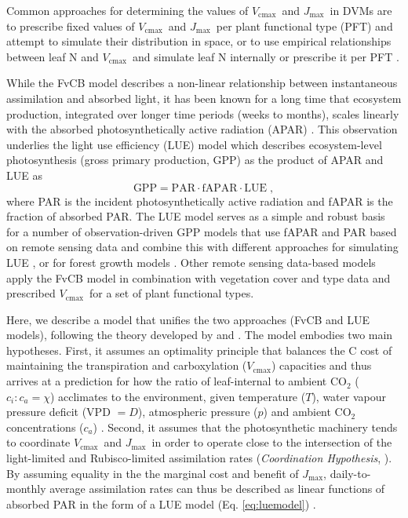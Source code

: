 \documentclass{myreport}
\newcommand{\vcmax}{$V_{\text{cmax}}$}
\newcommand{\jmax}{$J_{\text{max}}$}
\begin{document}
Common approaches for determining the values of \vcmax\ and \jmax\ in DVMs are to prescribe fixed values of \vcmax\ and \jmax\ per plant functional type (PFT) and attempt to simulate their distribution in space, or to use empirical relationships between leaf N and \vcmax\ and simulate leaf N internally or prescribe it per PFT \citep{smithdukes13gcb, rogers14}. 

While the FvCB model describes a non-linear relationship between instantaneous assimilation and absorbed light, it has been known for a long time that ecosystem production, integrated over longer time periods (weeks to months), scales linearly with the absorbed photosynthetically active radiation (APAR) \citep{monteith72, medlyn98}. This observation underlies the light use efficiency (LUE) model which describes ecosystem-level photosynthesis (gross primary production, GPP) as the product of APAR and LUE as
\begin{equation}
\label{eq:luemodel}
\text{GPP} = \text{PAR} \cdot \text{fAPAR} \cdot \text{LUE} \;,
\end{equation}
where PAR is the incident photosynthetically active radiation and fAPAR is the fraction of absorbed PAR. The LUE model serves as a simple and robust basis for a number of observation-driven GPP models that use fAPAR and PAR based on remote sensing data and combine this with different approaches for simulating LUE \citep{running04, Zhang2017-yr, field95rse}, or for forest growth models \citep{landsberg97fem}. Other remote sensing data-based models \citep{jiang16rse} apply the FvCB model in combination with vegetation cover and type data and prescribed \vcmax\ for a set of plant functional types.

Here, we describe a model that unifies the two approaches (FvCB and LUE models), following the theory developed by \cite{prentice14ecollett} and \cite{wang17natpl}. The model embodies two main hypotheses. First, it assumes an optimality principle that balances the C cost of maintaining the transpiration and carboxylation (\vcmax ) capacities and thus arrives at a prediction for how the ratio of leaf-internal to ambient CO$_2$ ($c_i:c_a = \chi$) acclimates to the environment, given temperature ($T$), water vapour pressure deficit (VPD $= D$), atmospheric pressure ($p$) and ambient CO$_2$ concentrations ($c_a$)  \citep{prentice14ecollett}. Second, it assumes that the photosynthetic machinery tends to coordinate \vcmax\ and \jmax\ in order to operate close to the intersection of the light-limited and Rubisco-limited assimilation rates (\textit{Coordination Hypothesis}, \cite{chen93, maire12po}). %
By assuming equality in the the marginal cost and benefit of \jmax , daily-to-monthly average assimilation rates can thus be described as linear functions of absorbed PAR in the form of a LUE model (Eq. \ref{eq:luemodel}) \citep{wang17natpl}.  
\end{document}
